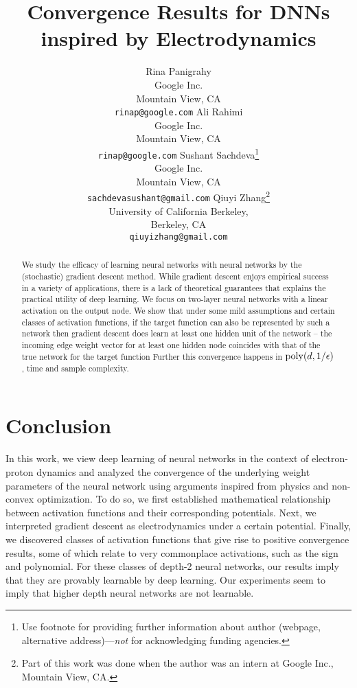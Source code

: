 \documentclass{article}
\title{Convergence Results for DNNs inspired by Electrodynamics
}
\author{
Rina Panigrahy \\
Google Inc. \\
Mountain View, CA\\
\texttt{rinap@google.com}
Ali Rahimi \\
Google Inc. \\
Mountain View, CA\\
\texttt{rinap@google.com}
\And
 Sushant Sachdeva\thanks{Use footnote for providing further
    information about author (webpage, alternative
    address)---\emph{not} for acknowledging funding agencies.}  \\
Google Inc. \\
Mountain View, CA \\
\texttt{sachdevasushant@gmail.com}  
\And
Qiuyi Zhang\thanks{Part of this work was done when the author was
an intern at Google Inc., Mountain View, CA.}  \\
University of California Berkeley, \\
Berkeley, CA \\
\texttt{qiuyizhang@gmail.com}
}
\begin{document}
 
\maketitle

\begin{abstract} 
  We study the efficacy of learning neural networks with neural
  networks by the (stochastic) gradient descent method. While gradient
  descent enjoys empirical success in a variety of applications, there
  is a lack of theoretical guarantees that explains the practical
  utility of deep learning. We focus on two-layer neural networks with
  a linear activation on the output node. We show that under some mild
  assumptions and certain classes of activation functions, if the target function can also be represented by such a network then gradient descent does learn at least one hidden unit of the network -- the incoming edge weight vector for at least one hidden node coincides with that of the true network for the target function %
  Further this convergence happens in
  $\mathrm{poly}(d,1/\epsilon)$, time and sample complexity.
\end{abstract} 








\section{Conclusion}

In this work, we view deep learning of neural networks in the context of electron-proton dynamics and analyzed the convergence of the underlying weight parameters of the neural network using arguments inspired from physics and non-convex optimization. To do so, we first established mathematical relationship between activation functions and their corresponding potentials. Next, we interpreted gradient descent as electrodynamics under a certain potential. Finally, we discovered classes of activation functions that give rise to positive convergence results, some of which relate to very commonplace activations, such as the sign and polynomial. For these classes of depth-2 neural networks, our results imply that they are provably learnable by deep learning. Our experiments seem to imply that higher depth neural networks are not learnable. 
\end{document}
